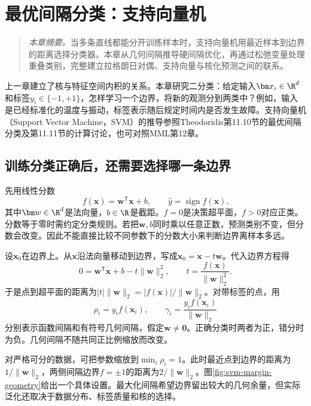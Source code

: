 \chapter{最优间隔分类：支持向量机}
\label{chap:svm}
\label{chap:kernel-algorithms}
\begin{quote}\small
\textit{本章摘要。}当多条直线都能分开训练样本时，支持向量机用最近样本到边界的距离选择分类器。本章从几何间隔推导硬间隔优化，再通过松弛变量处理重叠类别，完整建立拉格朗日对偶、支持向量与核化预测之间的联系。
\end{quote}

上一章建立了核与特征空间内积的关系。本章研究二分类：给定输入$\bm x_i\in\R^d$和标签$y_i\in\{-1,+1\}$，怎样学习一个边界，将新的观测分到两类中？例如，输入是已经标准化的温度与振动，标签表示随后规定时间内是否发生故障。支持向量机（Support Vector Machine，SVM）的推导参照Theodoridis第11.10节的最优间隔分类及第11.11节的计算讨论\cite{theodoridis2015ml}，也可对照MML第12章\cite{deisenroth2020mml}。

\section{训练分类正确后，还需要选择哪一条边界}
先用线性分数
\begin{equation}
 f(\bm x)=\bm w^{\mathsf T}\bm x+b,\qquad
 \hat y=\operatorname{sign} f(\bm x).
\end{equation}
其中$\bm w\in\R^d$是法向量，$b\in\R$是截距。$f=0$是决策超平面，$f>0$对应正类。分数等于零时需约定分类规则。若把$\bm w,b$同时乘以任意正数，预测类别不变，但分数会改变。因此不能直接比较不同参数下的分数大小来判断边界离样本多远。

设$\bm x_0$在边界上。从$\bm x$沿法向量移动到边界，写成$\bm x_0=\bm x-t\bm w$。代入边界方程得
\begin{equation}
 0=\bm w^{\mathsf T}\bm x+b-t\|\bm w\|_2^2,
 \qquad t=\frac{f(\bm x)}{\|\bm w\|_2^2}.
\end{equation}
于是点到超平面的距离为$|t|\|\bm w\|_2=|f(\bm x)|/\|\bm w\|_2$。对带标签的点，用
\begin{equation}
 \rho_i=y_if(\bm x_i),\qquad
 \gamma_i=\frac{y_if(\bm x_i)}{\|\bm w\|_2}
 \label{eq:svm-geometric-margin}
\end{equation}
分别表示函数间隔和有符号几何间隔，假定$\bm w\ne\bm0$。正确分类时两者为正，错分时为负。几何间隔不随共同正比例缩放而改变。

对严格可分的数据，可把参数缩放到$\min_i\rho_i=1$。此时最近点到边界的距离为$1/\|\bm w\|_2$，两侧间隔边界$f=\pm1$的距离为$2/\|\bm w\|_2$。图\ref{fig:svm-margin-geometry}给出一个具体设置。最大化间隔希望边界留出较大的几何余量，但实际泛化还取决于数据分布、标签质量和核的选择。

